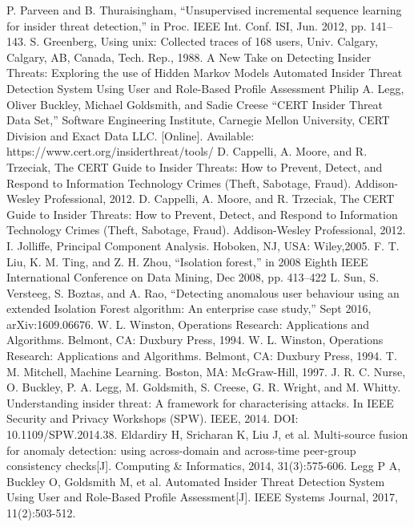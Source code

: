 \documentclass[conference]{IEEEtran}
\begin{document}
\begin{thebibliography}{00}
P. Parveen and B. Thuraisingham, “Unsupervised incremental sequence learning for insider threat detection,” in Proc. IEEE Int. Conf. ISI, Jun. 2012, pp. 141–143.
S. Greenberg, Using unix: Collected traces of 168 users, Univ. Calgary, Calgary, AB, Canada, Tech. Rep., 1988.
A New Take on Detecting Insider Threats: Exploring the use of Hidden Markov Models
Automated Insider Threat Detection System Using User and Role-Based Profile Assessment Philip A. Legg, Oliver Buckley, Michael Goldsmith, and Sadie Creese
“CERT Insider Threat Data Set,” Software Engineering Institute, Carnegie Mellon University, CERT Division and Exact
Data LLC. [Online]. Available: https://www.cert.org/insiderthreat/tools/
D. Cappelli, A. Moore, and R. Trzeciak, The CERT Guide to Insider Threats: How to Prevent, Detect, and Respond
to Information Technology Crimes (Theft, Sabotage, Fraud). Addison-Wesley Professional, 2012.
 D. Cappelli, A. Moore, and R. Trzeciak, The CERT Guide to Insider Threats: How to Prevent, Detect, and Respond
to Information Technology Crimes (Theft, Sabotage, Fraud). Addison-Wesley Professional, 2012.
I. Jolliffe, Principal Component Analysis. Hoboken, NJ, USA: Wiley,2005.
F. T. Liu, K. M. Ting, and Z. H. Zhou, “Isolation forest,” in 2008 Eighth IEEE International Conference on Data Mining,
Dec 2008, pp. 413–422
L. Sun, S. Versteeg, S. Boztas, and A. Rao, “Detecting anomalous user behaviour using an extended Isolation Forest algorithm: An enterprise case study,” Sept 2016, arXiv:1609.06676.
W. L. Winston, Operations Research: Applications and Algorithms. Belmont, CA: Duxbury Press, 1994.
W. L. Winston, Operations Research: Applications and Algorithms. Belmont, CA: Duxbury Press, 1994.
T. M. Mitchell, Machine Learning. Boston,
MA: McGraw-Hill, 1997.
 J. R. C. Nurse, O. Buckley, P. A. Legg, M. Goldsmith, S. Creese, G. R. Wright, and M. Whitty. Understanding insider threat: A framework for characterising attacks. In IEEE Security and Privacy Workshops (SPW). IEEE, 2014. DOI: 10.1109/SPW.2014.38.
Eldardiry H, Sricharan K, Liu J, et al. Multi-source fusion for anomaly detection: using across-domain and across-time peer-group consistency checks[J]. Computing \& Informatics, 2014, 31(3):575-606.
 Legg P A, Buckley O, Goldsmith M, et al. Automated Insider Threat Detection System Using User and Role-Based Profile Assessment[J]. IEEE Systems Journal, 2017, 11(2):503-512.






\end{thebibliography}
\end{document}
